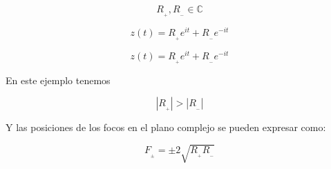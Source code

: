 \documentclass[preview]{standalone}
\begin{document}
\begin{center}
$$ R_{_+} , R_{_-} \in \mathbb{C}$$  

$$z(t)=R_{_+} e^{it} +R_{_-} e^{-it}$$ 

$$z(t)=R_{_+} e^{it} +R_{_-} e^{-it}$$ 

En este ejemplo tenemos 

$$|R_{_+}|>|R_{_-}|$$ 

Y las posiciones de los focos en el plano complejo se pueden expresar como:

$$F_{_{\pm}}=\pm 2\sqrt{R_{_+}R_{_-}}$$
\end{center}
\end{document}
